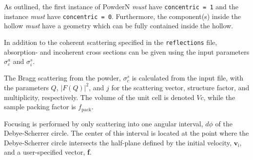 As outlined, the first instance of PowderN \emph{must} have \verb+concentric = 1+ and the instance \emph{must}
have \verb+concentric = 0+. Furthermore, the component(s) inside the hollow \emph{must} have a geometry which can
be fully contained inside the hollow.


In addition to the coherent scattering specified in the \verb+reflections+ file, absorption- and incoherent 
cross sections can be given using the input parameters $\sigma_c^a$ and $\sigma_i^s$.


The Bragg scattering from the powder,
$\sigma_c^s$ is calculated from the input file, with the parameters
$Q$, $|F(Q)|^2$, and $j$ for the scattering vector, structure factor, and
multiplicity, respectively. The volume of the unit cell is denoted $Vc$,
while the sample packing factor is $f_\textrm{pack}$.



Focusing is performed by only scattering into one angular
interval, $d\phi$ of the Debye-Scherrer circle. The center of this
interval is located at the point where the Debye-Scherrer circle
intersects the half-plane defined by the initial velocity, $\textbf{v}_\textrm{i}$,
and a user-specified vector, \textbf{f}.

%

